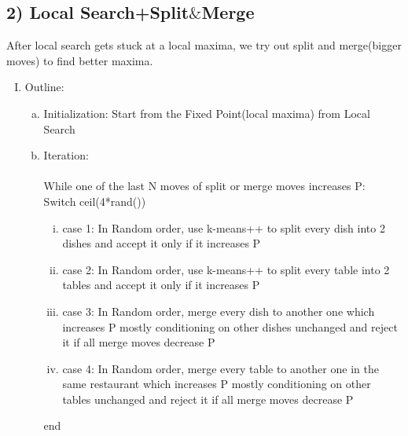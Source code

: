 \documentclass{article}
\begin{document}
\begin{spacing}{1.1}
\subsection{2) Local Search+Split$\&$Merge}
After local search gets stuck at a local maxima, we try out split and merge(bigger moves) to find better maxima.
\begin{enumerate}[(I)]
 \item Outline:
\begin{enumerate}[(a)]
\item Initialization: Start from the Fixed Point(local maxima) from Local Search
\item Iteration:\\
\\ While one of the last N moves of split or merge moves increases P:\\
Switch ceil(4*rand())
\begin{enumerate}[(i)]

\item case 1: In Random order, use k-means++ to split every dish into 2 dishes and accept it only if it increases P
\item case 2: In Random order, use k-means++ to split every table into 2 tables and accept it only if it increases P
\item case 3: In Random order, merge every dish to another one which increases P mostly conditioning on other dishes unchanged and reject it if all merge moves decrease P
\item case 4: In Random order, merge every table to another one in the same restaurant which increases P mostly conditioning on other tables unchanged and reject it if all merge moves decrease P
\end{enumerate}
end
\end{enumerate}




\end{enumerate}
\end{spacing}
\end{document}
